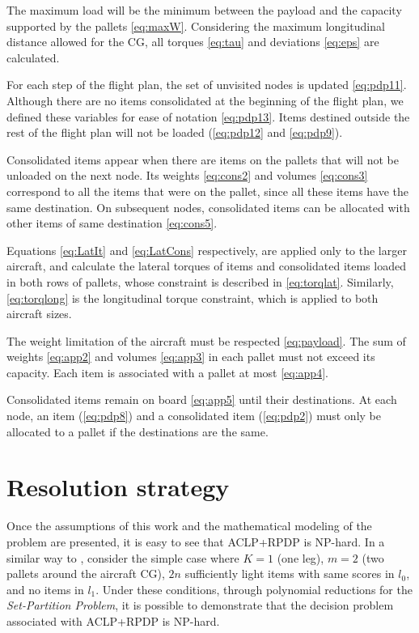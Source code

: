 \documentclass[preprint,authoryear]{elsarticle}
\begin{document}
The maximum load will be the minimum between the payload and the capacity supported by the pallets \ref{eq:maxW}. Considering the maximum longitudinal distance allowed for the CG, all torques \ref{eq:tau} and deviations \ref{eq:eps} are calculated.

For each step of the flight plan, the set of unvisited nodes is updated \ref{eq:pdp11}. Although there are no items consolidated at the beginning of the flight plan, we defined these variables for ease of notation \ref{eq:pdp13}. Items destined outside the rest of the flight plan will not be loaded (\ref{eq:pdp12} and \ref{eq:pdp9}).

Consolidated items appear when there are items on the pallets that will not be unloaded on the next node. Its weights \ref{eq:cons2} and volumes \ref{eq:cons3} correspond to all the items that were on the pallet, since all these items have the same destination. On subsequent nodes, consolidated items can be allocated with other items of same destination \ref{eq:cons5}.

Equations \ref{eq:LatIt} and \ref{eq:LatCons} respectively, are applied only to the larger aircraft, and calculate the lateral torques of items and consolidated items loaded in both rows of pallets, whose constraint is described in \ref{eq:torqlat}. Similarly, \ref{eq:torqlong} is the longitudinal torque constraint, which is applied to both aircraft sizes.

The weight limitation of the aircraft must be respected \ref{eq:payload}. The sum of weights \ref{eq:app2} and volumes \ref{eq:app3} in each pallet must not exceed its capacity. Each item is associated with a pallet at most \ref{eq:app4}.

Consolidated items remain on board \ref{eq:app5} until their destinations. At each node, an item (\ref{eq:pdp8}) and a consolidated item (\ref{eq:pdp2}) must only be allocated to a pallet if the destinations are the same.



\section{Resolution strategy}
\label{sec5}

Once the assumptions of this work and the mathematical modeling of the problem are presented, it is easy to see that ACLP+RPDP is NP-hard. In a similar way to \cite[p. 6]{LurkinSchyns2015}, consider the simple case where $K=1$\/ (one leg), $m=2$ (two pallets around the aircraft CG), $2n$\/ sufficiently light items with same scores in $l_0$, and no items in $l_1$. Under these conditions, through polynomial reductions for the {\it Set-Partition Problem}, it is possible to demonstrate that the decision problem associated with ACLP+RPDP is NP-hard.
\end{document}
